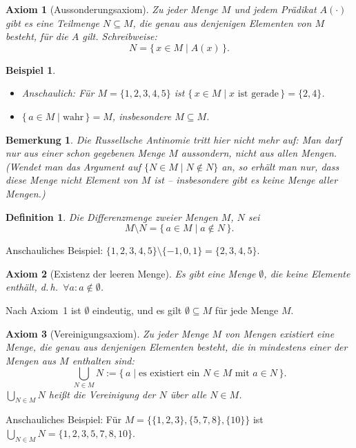 \documentclass[a4paper]{article}
\theoremstyle{kurzskript}
\newtheorem{definition}[satz]{Definition}
\newtheorem{axiom}{Axiom}                    %
\newtheorem*{bsp}{Beispiel}
\newtheorem*{bem}{Bemerkung}
\begin{document}
\begin{axiom}[Aussonderungsaxiom]
Zu jeder Menge $M$ und jedem Prädikat $A(\cdot)$ gibt es eine Teilmenge $N \subseteq M$, die genau aus denjenigen Elementen von $M$ besteht, für die $A$ gilt. Schreibweise:
\[
  N = \{\, x \in M \mid A(x) \,\}.
\]
\end{axiom}

\begin{bsp}
\leavevmode
\begin{itemize}
  \item Anschaulich: Für $M = \{1, 2, 3, 4, 5\}$ ist $\{\, x \in M \mid x \text{ ist gerade} \,\} = \{2, 4\}$.
  \item $\{\, a \in M \mid \text{wahr} \,\} = M$, insbesondere $M \subseteq M$.
\end{itemize}
\end{bsp}

\begin{bem}
Die Russellsche Antinomie tritt hier nicht mehr auf: Man darf nur \emph{aus einer schon gegebenen Menge} $M$ aussondern, nicht \glqq aus allen Mengen\grqq. (Wendet man das Argument auf $\{N \in M \mid N \notin N\}$ an, so erhält man nur, dass diese Menge nicht Element von $M$ ist -- insbesondere gibt es keine \glqq Menge aller Mengen\grqq.)
\end{bem}

\begin{definition}
Die \emph{Differenzmenge} zweier Mengen $M$, $N$ sei
\[
  M \setminus N = \{\, a \in M \mid a \notin N \,\}.
\]
\end{definition}
Anschauliches Beispiel: $\{1, 2, 3, 4, 5\} \setminus \{-1, 0, 1\} = \{2, 3, 4, 5\}$.

\begin{axiom}[Existenz der leeren Menge]
Es gibt eine Menge $\emptyset$, die keine Elemente enthält, d.\,h.\ $\forall a\colon a \notin \emptyset$.
\end{axiom}
Nach Axiom~1 ist $\emptyset$ eindeutig, und es gilt $\emptyset \subseteq M$ für jede Menge $M$.

\begin{axiom}[Vereinigungsaxiom]
Zu jeder Menge $M$ von Mengen existiert eine Menge, die genau aus denjenigen Elementen besteht, die in mindestens einer der Mengen aus $M$ enthalten sind:
\[
  \bigcup_{N \in M} N := \{\, a \mid \text{es existiert ein } N \in M \text{ mit } a \in N \,\}.
\]
$\bigcup_{N \in M} N$ heißt die \emph{Vereinigung} der $N$ über alle $N \in M$.
\end{axiom}
Anschauliches Beispiel: Für $M = \bigl\{\{1, 2, 3\}, \{5, 7, 8\}, \{10\}\bigr\}$ ist $\bigcup_{N \in M} N = \{1, 2, 3, 5, 7, 8, 10\}$.
\end{document}
